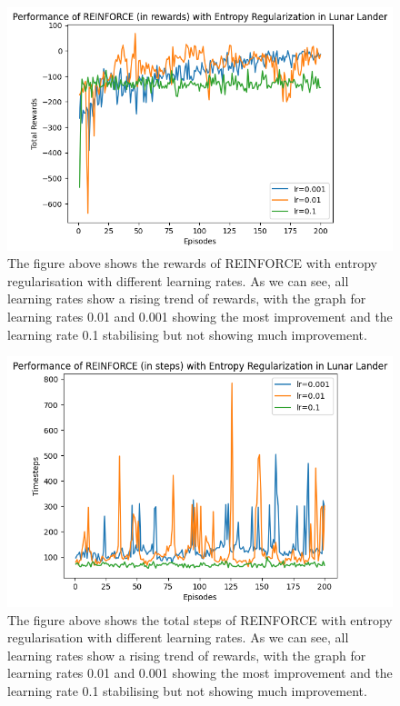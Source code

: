 \documentclass{article}
\begin{document}
\begin{figure}[htbp]
\centering
\includegraphics[width=0.9\linewidth]{Report/images/entropy_regularisation.png}
\caption{\label{fig:ReinforceEntropy_Rewards_LR}The figure above shows the rewards of REINFORCE with entropy regularisation with different learning rates. As we can see, all learning rates show a rising trend of rewards, with the graph for learning rates 0.01 and 0.001 showing the most improvement and the learning rate 0.1 stabilising but not showing much improvement. }
\end{figure}


\begin{figure}[htbp]
\centering
\includegraphics[width=0.9\linewidth]{Report/images/entropy_regularisation_2.png}
\caption{\label{fig:ReinforceEntropy_Rewards_Steps}The figure above shows the total steps of REINFORCE with entropy regularisation with different learning rates. As we can see, all learning rates show a rising trend of rewards, with the graph for learning rates 0.01 and 0.001 showing the most improvement and the learning rate 0.1 stabilising but not showing much improvement. }
\end{figure}
\end{document}
